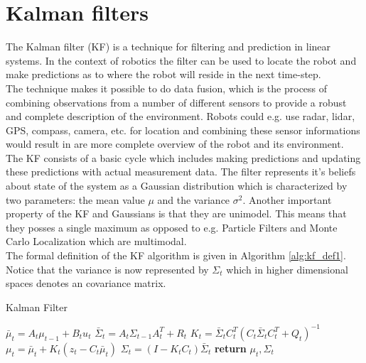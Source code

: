 
\section{Kalman filters}

The Kalman filter (KF) is a technique for filtering and prediction in linear systems. In the context of robotics the filter can be used to locate the robot and make predictions as to where the robot will reside in the next time-step.\\

The technique makes it possible to do data fusion, which is the process of combining observations from a number of different sensors to provide a robust and complete description of the environment. Robots could e.g. use radar, lidar, GPS, compass, camera, etc. for location and combining these sensor informations would result in are more complete overview of the robot and its environment.\\

The KF consists of a basic cycle which includes making predictions and updating these predictions with actual measurement data. The filter represents it's beliefs about state of the system as a Gaussian distribution which is characterized by two parameters: the mean value $\mu$ and the variance $\sigma^2$. Another important property of the KF and Gaussians is that they are unimodel. This means that they posses a single maximum as opposed to e.g. Particle Filters and Monte Carlo Localization which are multimodal.\\

The formal definition of the KF algorithm is given in Algorithm \ref{alg:kf_def1}. Notice that the variance is now represented by $\Sigma_{t}$ which in higher dimensional spaces denotes an covariance matrix.

\begin{center}
\begin{minipage}{.65\linewidth}
\begin{algorithm}[H]
\caption{Kalman Filter}
\label{alg:kf_def1}
\begin{algorithmic}[1]
  \State $\bar\mu_{t} = A_{t}\mu_{t-1} + B_{t}u_{t}$%
  \State $\bar\Sigma_{t} = A_{t}\Sigma_{t-1}A_{t}^T + R_{t}$
  \State $K_{t} = \bar\Sigma_{t}C_{t}^T(C_{t}\bar{\Sigma}_{t}C_{t}^T+Q_{t})^{-1}$
  \State $\mu_{t} = \bar\mu_{t} + K_{t}(z_{t} - C_{t}\bar\mu_{t})$
  \State $\Sigma_{t} = (I - K_{t}C_{t})\bar\Sigma_{t}$
  \State \textbf{return} $\mu_{t}, \Sigma_{t}$
\EndProcedure
\end{algorithmic}
\end{algorithm}
\end{minipage}
\end{center}

